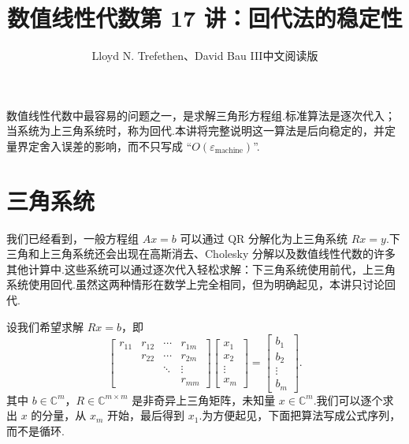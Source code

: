 \documentclass[UTF8,fontset=none,12pt]{ctexart}
\title{数值线性代数\quad 第 17 讲：回代法的稳定性}
\author{Lloyd N. Trefethen、David Bau III\quad 中文阅读版}
\date{}
\newcommand{\C}{\mathbb{C}}
\newcommand{\epsmach}{\varepsilon_{\mathrm{machine}}}
\theoremstyle{definition}
\begin{document}
\maketitle
\pagestyle{plain}

数值线性代数中最容易的问题之一，是求解三角形方程组.标准算法是逐次代入；当系统为上三角系统时，称为回代.本讲将完整说明这一算法是后向稳定的，并定量界定舍入误差的影响，而不只写成 ``$O(\epsmach)$''.

\section*{三角系统}

我们已经看到，一般方程组 $Ax=b$ 可以通过 QR 分解化为上三角系统 $Rx=y$.下三角和上三角系统还会出现在高斯消去、Cholesky 分解以及数值线性代数的许多其他计算中.这些系统可以通过逐次代入轻松求解：下三角系统使用前代，上三角系统使用回代.虽然这两种情形在数学上完全相同，但为明确起见，本讲只讨论回代.

设我们希望求解 $Rx=b$，即
\begin{equation}
\begin{bmatrix}
r_{11}&r_{12}&\cdots&r_{1m}\\
&r_{22}&\cdots&r_{2m}\\
&&\ddots&\vdots\\
&&&r_{mm}
\end{bmatrix}
\begin{bmatrix}x_1\\x_2\\\vdots\\x_m\end{bmatrix}
=\begin{bmatrix}b_1\\b_2\\\vdots\\b_m\end{bmatrix}.
\tag{17.1}
\end{equation}
其中 $b\in\C^m$，$R\in\C^{m\times m}$ 是非奇异上三角矩阵，未知量 $x\in\C^m$.我们可以逐个求出 $x$ 的分量，从 $x_m$ 开始，最后得到 $x_1$.为方便起见，下面把算法写成公式序列，而不是循环.

\begin{center}
\end{center}
\end{document}
